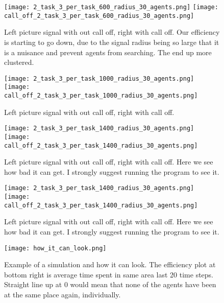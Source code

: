 \documentclass[a4paper]{article}
\begin{document}
\begin{figure}[H]
  \centering
  \texttt{[image: 2\_task\_3\_per\_task\_600\_radius\_30\_agents.png]}
   \label{non_random}
  \centering
  \texttt{[image: call\_off\_2\_task\_3\_per\_task\_600\_radius\_30\_agents.png]}
  \caption{Left picture signal with out call off, right with call off. Our efficiency is starting to go down, due to the signal radius being so large that it is a nuisance and prevent agents from searching. The end up more clustered.}
  \label{random_walls}
\end{figure}


\begin{figure}[H]
  \centering
  \texttt{[image: 2\_task\_3\_per\_task\_1000\_radius\_30\_agents.png]}
   \label{non_random}
  \centering
  \texttt{[image: call\_off\_2\_task\_3\_per\_task\_1000\_radius\_30\_agents.png]}
  \caption{Left picture signal with out call off, right with call off.}
  \label{random_walls}
\end{figure}



\begin{figure}[H]
  \centering
  \texttt{[image: 2\_task\_3\_per\_task\_1400\_radius\_30\_agents.png]}
   \label{non_random}
  \centering
  \texttt{[image: call\_off\_2\_task\_3\_per\_task\_1400\_radius\_30\_agents.png]}
  \caption{Left picture signal with out call off, right with call off. Here we see how bad it can get. I strongly suggest running the program to see it.}
  \label{random_walls}
\end{figure}


\begin{figure}[H]
  \centering
  \texttt{[image: 2\_task\_3\_per\_task\_1400\_radius\_30\_agents.png]}
   \label{non_random}
  \centering
  \texttt{[image: call\_off\_2\_task\_3\_per\_task\_1400\_radius\_30\_agents.png]}
  \caption{Left picture signal with out call off, right with call off. Here we see how bad it can get. I strongly suggest running the program to see it.}
  \label{random_walls}
\end{figure}



\begin{figure}[H]
  \centering
  \texttt{[image: how\_it\_can\_look.png]}
  \caption{Example of a simulation and how it can look. The efficiency plot at bottom right is average time spent in same area last 20 time steps. Straight line up at 0 would mean that none of the agents have been at the same place again, individually.}
  \label{simulation}
\end{figure}
\end{document}
